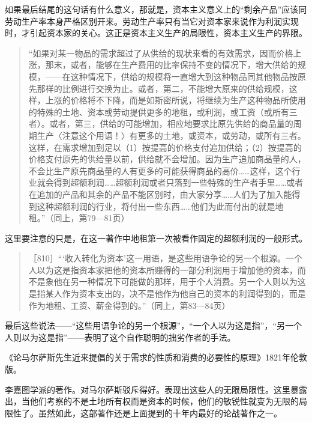 如果最后结尾的这句话有什么意义，那就是，资本主义意义上的“剩余产品”应该同劳动生产率本身严格区别开来。劳动生产率只有当它对资本家来说作为利润实现时，才引起资本家的关心。这正是资本主义生产的局限性，资本主义生产的界限。

\begin{quote}{“如果对某一物品的需求超过了从供给的现状来看的有效需求，因而价格上涨，那末，或者，能够在生产费用的比率保持不变的情况下，增大供给的规模，——在这种情况下，供给的规模将一直增大到这种物品同其他物品按原先那样的比例进行交换为止。或者，第二，不能增大原来的供给规模，这样，上涨的价格将不下降，而是如斯密所说，将继续为生产这种物品所使用的特殊的土地、资本或劳动提供更多的地租，或利润，或工资（或所有三者）。或者，第三，供给的可能增加，相应地要求比原先供给的商品量的周期生产〈注意这个用语！〉有更多的土地，或资本，或劳动，或所有三者。这样，在需求增加到足以（1）按提高的价格支付追加供给；（2）按提高的价格支付原先的供给量以前，供给就不会增加。因为生产追加商品量的人，不会比生产原先商品量的人有更多的可能获得商品的高价……这样，这个行业就会得到超额利润……超额利润或者只落到一些特殊的生产者手里……或者在追加的产品和其余的产品不能区别时，由大家分享……人们为了加入能得到这种超额利润的行业，将付出一些东西……他们为此而付出的就是地租。”（同上，第79—81页）}\end{quote}

这里要注意的只是，在这一著作中地租第一次被看作固定的超额利润的一般形式。

\begin{quote}{［810］“‘收入转化为资本’这一用语，是这些用语争论的另一个根源。一个人以为这是指资本家把他的资本所赚得的一部分利润用于增加他的资本，而不是象他在另一种情况下可能做的那样，用于个人消费。另一个人则以为这是指某人作为资本支出的，决不是他作为他自己的资本的利润得到的，而是作为地租、工资、薪金得到的。”（同上，第83—84页）}\end{quote}

最后这些说法——“这些用语争论的另一个根源”，“一个人以为这是指”，“另一个人则以为这是指”——表明了这个自作聪明的拙劣作者的手法。


《论马尔萨斯先生近来提倡的关于需求的性质和消费的必要性的原理》1821年伦敦版。

李嘉图学派的著作。对马尔萨斯驳斥得好。表现出这些人的无限局限性。这里暴露出，当他们考察的不是土地所有权而是资本的时候，他们的敏锐性就变为无限的局限性了。虽然如此，这部著作还是上面提到的十年内最好的论战著作之一。

